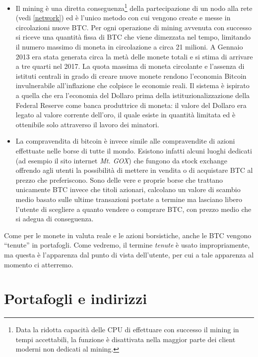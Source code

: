 \begin{itemize}
\item
  Il mining è una diretta conseguenza\footnote{Data la ridotta capacità delle CPU di effettuare con successo il mining in tempi accettabili, la funzione è disattivata nella maggior parte dei client moderni non dedicati al mining.} della partecipazione di un nodo   alla rete (vedi \ref{network}) ed è l'unico metodo con cui   vengono create e messe in circolazioni nuove BTC. Per ogni   operazione di mining avvenuta con successo si riceve una quantità   fissa di BTC che viene dimezzata nel tempo, limitando il numero   massimo di moneta in circolazione a circa 21 milioni. A Gennaio 2013 era stata generata circa la metà delle monete totali e si stima di   arrivare a tre quarti nel 2017. La quota massima di moneta circolante e   l'assenza di istituti centrali in grado di creare nuove monete rendono   l'economia Bitcoin invulnerabile all'inflazione che colpisce le   economie reali. Il sistema è ispirato a quella che era l'economia del   Dollaro prima della istituzionalizzazione della Federal Reserve come   banca produttrice di moneta: il valore del Dollaro era legato al valore corrente   dell'oro, il quale esiste in quantità limitata ed è ottenibile solo   attraverso il lavoro dei minatori.
\item
  La compravendita di bitcoin è invece simile alle compravendite di   azioni effettuate nelle borse di tutte il mondo. Esistono infatti   alcuni luoghi dedicati (ad esempio il sito internet \emph{Mt. GOX})   che fungono da stock exchange offrendo agli utenti la possibilità di   mettere in vendita o di acquistare BTC al prezzo che preferiscono.   Sono delle vere e proprie borse che trattano unicamente BTC invece   che titoli azionari, calcolano un valore di scambio   medio basato sulle ultime transazioni portate a termine ma lasciano   libero l'utente di scegliere a quanto vendere o comprare BTC, con   prezzo medio che si adegua di conseguenza.
\end{itemize}

Come per le monete in valuta reale e le azioni borsistiche, anche le BTC vengono ``tenute'' in portafogli. Come vedremo, il termine \emph{tenute} è usato impropriamente, ma questa è l'apparenza dal punto di vista dell'utente, per cui a tale apparenza al momento ci atterremo.

\section{Portafogli e indirizzi}\label{portafogli-e-indirizzi}

